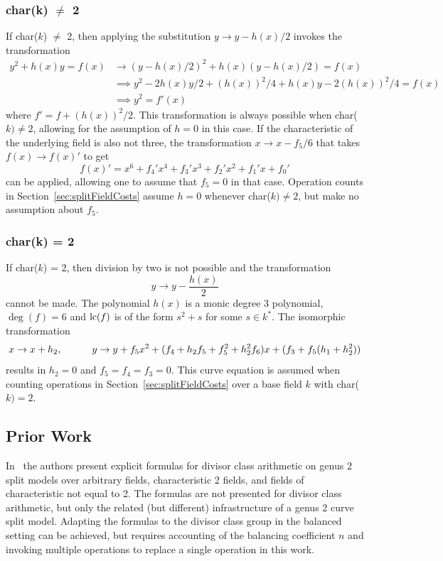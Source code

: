 \subsubsection{char(k) $\neq$ 2}
If char($k$) $\neq$ 2, then applying the substitution $y \rightarrow y - h(x)/2$
invokes the transformation 
\begin{align*}
y^2 + h(x)y = f(x) &\rightarrow (y-h(x)/2)^2 + h(x)(y - h(x)/2) = f(x) \\
                   &\implies y^2 -2h(x)y/2 + (h(x))^2/4 + h(x)y -2(h(x))^2/4 = f(x) \\
                   &\implies y^2 = f'(x)
\end{align*} 
where $f' = f + (h(x))^2/2$. This transformation is always possible when
char($k) \neq 2$, allowing for the assumption of $h=0$ in this case.  If the
characteristic of the underlying field is also not three, the transformation $ x
\rightarrow x - f_5/6 $ that takes $f(x) \rightarrow f(x)'$ to get $$ f(x)' =
x^6 + f_4'x^4 + f_3'x^3 + f_2'x^2 + f_1'x + f_0'$$ can be applied, allowing one
to assume that $f_5 = 0$ in that case. Operation counts in
Section~\ref{sec:splitFieldCosts} assume $h = 0$ whenever char($k) \neq 2$, but
make no assumption about $f_5$.

\subsubsection{char(k) = 2}
If char($k$) = 2, then division by two is not possible and the transformation $$
y \rightarrow y - \frac{h(x)}{2}$$ cannot be made. The polynomial $h(x)$ is a
monic degree 3 polynomial, $\deg(f) = 6$ and $\operatorname{lc}(f)$ is of the form $s^2 + s$
for some $s \in k^*$. The  isomorphic transformation $$ x \rightarrow x + h_2,
\quad\quad\quad y \rightarrow y +f_5x^2 + (f_4 + h_2f_5 + f_5^2 + h_2^2f_6)x + (f_3 +
f_5(h_1 + h_2^2))$$ results in $h_2 = 0$  and $f_5 = f_4 = f_3 = 0$. This curve
equation is assumed when counting operations in
Section~\ref{sec:splitFieldCosts} over a base field $k$ with char($k) = 2$. 

\subsection{Prior Work}
\label{sec:explSPLITPriorWork}

In~\cite{EricksonJacobsonStein_realg2_2011} the authors present explicit
formulas for divisor class arithmetic on genus 2 split models over arbitrary
fields, characteristic 2 fields, and fields of characteristic not equal to 2.
The formulas are not presented for divisor class arithmetic, but only the
related (but different) infrastructure of a genus 2 curve split model. Adapting
the formulas to the divisor class group in the balanced setting can be achieved,
but requires accounting of the balancing coefficient $n$ and invoking multiple
operations to replace a single operation in this work. 

